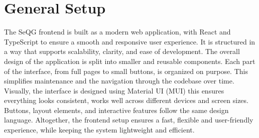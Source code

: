 \section{General Setup}

The SeQG frontend is built as a modern web application, with React and TypeScript to ensure a smooth and responsive user experience. 
It is structured in a way that supports scalability, clarity, and ease of development. 
The overall design of the application is split into smaller and reusable components. 
Each part of the interface, from full pages to small buttons, is organized on purpose. 
This simplifies maintenance and the navigation through the codebase over time.
Visually, the interface is designed using Material UI (MUI) this ensures everything looks consistent, works well across different devices and screen sizes. 
Buttons, layout elements, and interactive features follow the same design language. 
Altogether, the frontend setup ensures a fast, flexible and user-friendly experience, while keeping the system lightweight and efficient.

